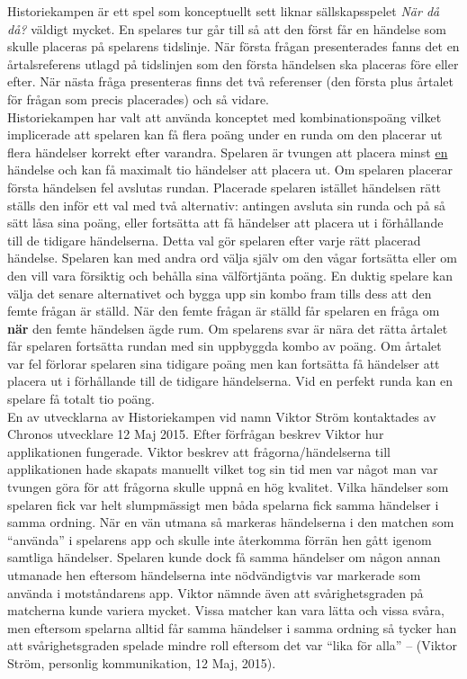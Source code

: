 \documentclass[a4paper, 11pt]{article}
\begin{document}
Historiekampen är ett spel som konceptuellt sett liknar sällskapsspelet \textit{När då då?} väldigt mycket. En spelares tur går till så att den först får en händelse som skulle placeras på spelarens tidslinje. När första frågan presenterades fanns det en årtalsreferens utlagd på tidslinjen som den första händelsen ska placeras före eller efter. När nästa fråga presenteras finns det två referenser (den första plus årtalet för frågan som precis placerades) och så vidare.\\ 
Historiekampen har valt att använda konceptet med kombinationspoäng vilket implicerade att spelaren kan få flera poäng under en runda om den placerar ut flera händelser korrekt efter varandra. Spelaren är tvungen att placera minst \underline{en} händelse och kan få maximalt tio händelser att placera ut. Om spelaren placerar första händelsen fel avslutas rundan. Placerade spelaren istället händelsen rätt ställs den inför ett val med två alternativ: antingen avsluta sin runda och på så sätt låsa sina poäng, eller fortsätta att få händelser att placera ut i förhållande till de tidigare händelserna. Detta val gör spelaren efter varje rätt placerad händelse. Spelaren kan med andra ord välja själv om den vågar fortsätta eller om den vill vara försiktig och behålla sina välförtjänta poäng. En duktig spelare kan välja det senare alternativet och bygga upp sin kombo fram tills dess att den femte frågan är ställd. När den femte frågan är ställd får spelaren en fråga om \textbf{när} den femte händelsen ägde rum. Om spelarens svar är nära det rätta årtalet får spelaren fortsätta rundan med sin uppbyggda kombo av poäng. Om årtalet var fel förlorar spelaren sina tidigare poäng men kan fortsätta få händelser att placera ut i förhållande till de tidigare händelserna. Vid en perfekt runda kan en spelare få totalt tio poäng.\\

En av utvecklarna av Historiekampen vid namn Viktor Ström kontaktades av Chronos utvecklare 12 Maj 2015. Efter förfrågan beskrev Viktor hur applikationen fungerade. Viktor beskrev att frågorna/händelserna till applikationen hade skapats manuellt vilket tog sin tid men var något man var tvungen göra för att frågorna skulle uppnå en hög kvalitet. Vilka händelser som spelaren fick var helt slumpmässigt men båda spelarna fick samma händelser i samma ordning. När en vän utmana så markeras händelserna i den matchen som ``använda'' i spelarens app och skulle inte återkomma förrän hen gått igenom samtliga händelser. Spelaren kunde dock få samma händelser om någon annan utmanade hen eftersom händelserna inte nödvändigtvis var markerade som använda i motståndarens app. 
Viktor nämnde även att svårighetsgraden på matcherna kunde variera mycket. Vissa matcher kan vara lätta och vissa svåra, men eftersom spelarna alltid får samma händelser i samma ordning så tycker han att svårighetsgraden spelade mindre roll eftersom det var ``lika för alla'' -- (Viktor Ström, personlig kommunikation, 12 Maj, 2015). 
\end{document}
